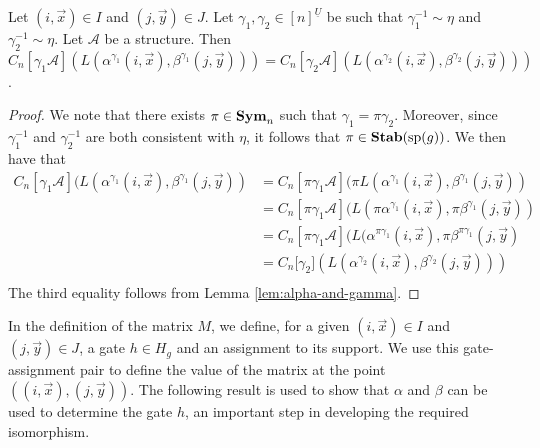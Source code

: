 \documentclass[../paper.tex]{subfiles}
\begin{document}
\begin{lem}
	\label{lem:alpha-ind-gamma}
	Let $(i,\vec{x}) \in I$ and $(j, \vec{y}) \in J$. Let $\gamma_1, \gamma_2 \in
  [n]^{\underline{U}}$ be such that $\gamma^{-1}_1 \sim \eta$ and $\gamma^{-1}_2
  \sim \eta$. Let $\mathcal{A}$ be a structure. Then $C_n[\gamma_1 \mathcal{A}]
  (L(\alpha^{\gamma_1}(i, \vec{x}), \beta^{\gamma_1}(j, \vec{y}))) =
  C_n[\gamma_2 \mathcal{A}] (L(\alpha^{\gamma_2}(i, \vec{x}),
  \beta^{\gamma_2}(j, \vec{y})))$.
\end{lem}
\begin{proof}
	We note that there exists $\pi \in \text{\textbf{Sym}}_n$ such that $\gamma_1 = \pi
  \gamma_2$. Moreover, since $\gamma^{-1}_1$ and $\gamma^{-1}_2$ are both
  consistent with $\eta$, it follows that $\pi \in \text{\textbf{Stab}} (\text{sp} (g))$. We then have
  that
	\begin{align*}
		C_n[\gamma_1 \mathcal{A}](L(\alpha^{\gamma_1}(i, \vec{x}), \beta^{\gamma_1}(j,
		\vec{y})) & = C_n[\pi \gamma_1 \mathcal{A}](\pi L(\alpha^{\gamma_1}(i, \vec{x}), 
                \beta^{\gamma_1}(j, \vec{y})) \\
		          & = C_n[\pi \gamma_1 \mathcal{A}](L(\pi                                
                \alpha^{\gamma_1}(i, \vec{x}), \pi \beta^{\gamma_1}(j, \vec{y}))\\
		          & = C_n[\pi                                                            
                \gamma_1 \mathcal{A}](L(\alpha^{\pi \gamma_1}(i, \vec{x}), \pi \beta^{\pi
                \gamma_1}(j, \vec{y})\\
		          & = C_n[\gamma_2 \mathcal] (L(\alpha^{\gamma_2}(i,                     
                \vec{x}), \beta^{\gamma_2}(j, \vec{y})))\\
	\end{align*}The third equality follows from Lemma \ref{lem:alpha-and-gamma}.
\end{proof}

In the definition of the matrix $M$, we define, for a given $(i, \vec{x}) \in I$
and $(j, \vec{y}) \in J$, a gate $h \in H_g$ and an assignment to its support.
We use this gate-assignment pair to define the value of the matrix at the point
$((i, \vec{x}), (j, \vec{y}))$. The following result is used to show that
$\alpha$ and $\beta$ can be used to determine the gate $h$, an important step in
developing the required isomorphism.
\end{document}
